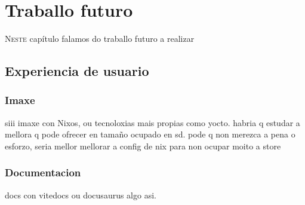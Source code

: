 \chapter{Traballo futuro}
\label{chap:futuro}

\lettrine{N}{este} capítulo falamos do traballo futuro a realizar

\section{Experiencia de usuario}

\subsection{Imaxe}
siii imaxe con Nixos, ou tecnoloxias mais propias como yocto.
habria q estudar a mellora q pode ofrecer en tamaño ocupado en sd.
pode q non merezca a pena o esforzo, seria mellor mellorar a config de nix para non ocupar moito a store

\subsection{Documentacion}
docs con vitedocs ou docusaurus algo asi.



